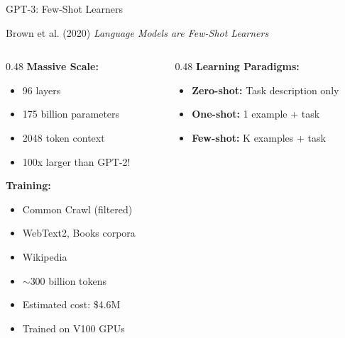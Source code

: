 \documentclass[aspectratio=169]{beamer}
\begin{document}
\begin{frame}{GPT-3: Few-Shot Learners 🚀}
\begin{block}{Brown et al. (2020)}
\textit{Language Models are Few-Shot Learners}
\end{block}

\vspace{0.5em}

\begin{columns}[T]
\begin{column}{0.48\textwidth}
\textbf{Massive Scale:}
\begin{itemize}
    \item 96 layers
    \item \alert{175 billion parameters}
    \item 2048 token context
    \item 100x larger than GPT-2!
\end{itemize}

\vspace{0.5em}

\textbf{Training:}
\begin{itemize}
    \item Common Crawl (filtered)
    \item WebText2, Books corpora
    \item Wikipedia
    \item $\sim$300 billion tokens
    \item Estimated cost: \$4.6M
    \item Trained on V100 GPUs
\end{itemize}
\end{column}

\begin{column}{0.48\textwidth}
\textbf{Learning Paradigms:}

\vspace{0.3em}

\begin{itemize}
    \item \textbf{Zero-shot:} Task description only
    \item \textbf{One-shot:} 1 example + task
    \item \textbf{Few-shot:} K examples + task
\end{itemize}

\vspace{0.5em}


\end{column}
\end{columns}
\end{frame}
\end{document}

